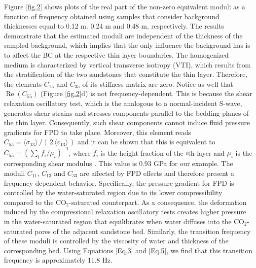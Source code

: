 \documentclass[draft]{agujournal2019}
\renewcommand{\Re}{\operatorname{Re} }
\begin{document}
Figure \ref{fig.2} shows plots of the real part of the non-zero equivalent moduli as a function of frequency obtained using samples that consider background thicknesses equal to 0.12 m. 0.24 m and 0.48 m, respectively. The results demonstrate that the estimated moduli are independent of the thickness of the sampled background, which implies that the only influence the background has is to affect the BC at the respective thin layer boundaries. 
The homogenized medium is
characterized by vertical transverse isotropy (VTI), which results from the stratification   of the two sandstones that constitute the thin layer. Therefore, the elements $C_{15}$ and $C_{35}$ of its stiffness matrix are zero. Notice as well that $\Re(C_{55})$  (Figure \ref{fig.2}d) is not frequency-dependent. This is because the shear relaxation oscillatory test, which is the analogous to a normal-incident S-wave, generates shear strains and stresses components  parallel to the bedding planes of the thin layer. Consequently, such shear components cannot induce fluid pressure gradients for FPD to take place. Moreover, this element reads $C_{55} = \langle \sigma_{13}\rangle\,/(\,2\, \langle \varepsilon_{13} \rangle\,)$ and it can be shown that this is equivalent to $C_{55}  =\left( \sum_i f_i/\mu_i \right)^{-1}$, where $f_i$ is the height fraction of the $i$th layer and $\mu_i$ is the corresponding shear modulus \cite{Backus1962, Salamon1968}. This value is 0.93 GPa for our example. The moduli  $C_{11}$, $C_{13}$ and $C_{33}$ are affected by FPD effects and therefore present a frequency-dependent behavior. Specifically, the pressure gradient for FPD is controlled by the water-saturated region due to its lower compressibility compared to the CO$_2$-saturated counterpart. As a consequence, the deformation induced by the compressional relaxation oscillatory tests creates higher pressure in the water-saturated region that equilibrates when water diffuses into the CO$_2$-saturated pores of the adjacent sandstone bed. Similarly, the transition frequency of these moduli is controlled by the viscosity of water and thickness of the corresponding bed. Using Equations \eqref{Eq.3} and \eqref{Eq.5}, we find that this transition frequency is approximately 11.8 Hz. 
\end{document}
